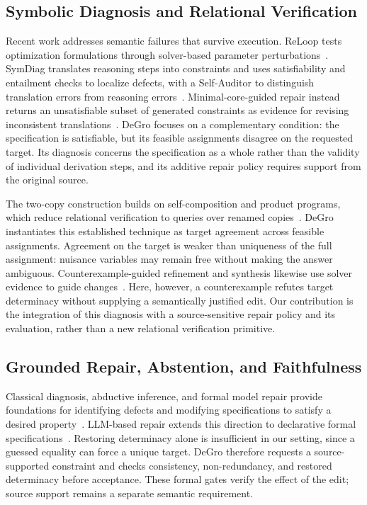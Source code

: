 \documentclass[sigconf,anonymous]{aamas}
\begin{document}
\subsection{Symbolic Diagnosis and Relational Verification}
Recent work addresses semantic failures that survive execution.  ReLoop tests optimization formulations through solver-based parameter perturbations~\cite{lian2026reloop}.  SymDiag translates reasoning steps into constraints and uses satisfiability and entailment checks to localize defects, with a Self-Auditor to distinguish translation errors from reasoning errors~\cite{cui2026symdiag}.  Minimal-core-guided repair instead returns an unsatisfiable subset of generated constraints as evidence for revising inconsistent translations~\cite{sarkar2026cores,liffiton2008mus}.  DeGro focuses on a complementary condition: the specification is satisfiable, but its feasible assignments disagree on the requested target.  Its diagnosis concerns the specification as a whole rather than the validity of individual derivation steps, and its additive repair policy requires support from the original source.

The two-copy construction builds on self-composition and product programs, which reduce relational verification to queries over renamed copies~\cite{barthe2004selfcomposition,terauchi2005safety,barthe2011product}.  DeGro instantiates this established technique as target agreement across feasible assignments.  Agreement on the target is weaker than uniqueness of the full assignment: nuisance variables may remain free without making the answer ambiguous.  Counterexample-guided refinement and synthesis likewise use solver evidence to guide changes~\cite{clarke2000cegar,solarlezama2006cegis}.  Here, however, a counterexample refutes target determinacy without supplying a semantically justified edit.  Our contribution is the integration of this diagnosis with a source-sensitive repair policy and its evaluation, rather than a new relational verification primitive.

\subsection{Grounded Repair, Abstention, and Faithfulness}
Classical diagnosis, abductive inference, and formal model repair provide foundations for identifying defects and modifying specifications to satisfy a desired property~\cite{reiter1987diagnosis,dillig2013abduction,attie2008modelrepair}.  LLM-based repair extends this direction to declarative formal specifications~\cite{alhanahnah2024alloyrepair}.  Restoring determinacy alone is insufficient in our setting, since a guessed equality can force a unique target.  DeGro therefore requests a source-supported constraint and checks consistency, non-redundancy, and restored determinacy before acceptance.  These formal gates verify the effect of the edit; source support remains a separate semantic requirement.
\end{document}
